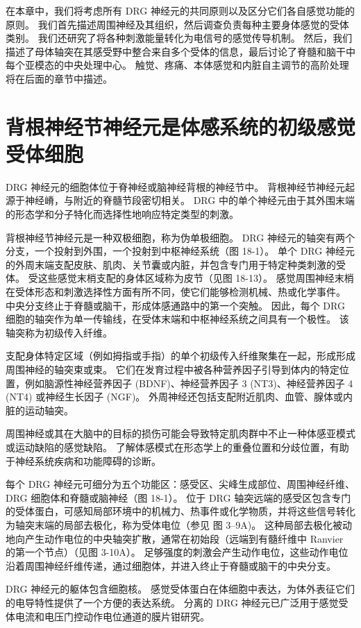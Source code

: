 在本章中，我们将考虑所有 DRG 神经元的共同原则以及区分它们各自感觉功能的原则。 我们首先描述周围神经及其组织，然后调查负责每种主要身体感觉的受体类别。 我们还研究了将各种刺激能量转化为电信号的感觉传导机制。 然后，我们描述了母体轴突在其感受野中整合来自多个受体的信息，最后讨论了脊髓和脑干中每个亚模态的中央处理中心。 触觉、疼痛、本体感觉和内脏自主调节的高阶处理将在后面的章节中描述。


\section{背根神经节神经元是体感系统的初级感觉受体细胞}

DRG 神经元的细胞体位于脊神经或脑神经背根的神经节中。 背根神经节神经元起源于神经嵴，与附近的脊髓节段密切相关。 DRG 中的单个神经元由于其外围末端的形态学和分子特化而选择性地响应特定类型的刺激。

背根神经节神经元是一种双极细胞，称为伪单极细胞。 DRG 神经元的轴突有两个分支，一个投射到外围，一个投射到中枢神经系统（图 18-1）。 单个 DRG 神经元的外周末端支配皮肤、肌肉、关节囊或内脏，并包含专门用于特定种类刺激的受体。 受这些感觉末梢支配的身体区域称为皮节（见图 18-13）。 感觉周围神经末梢在受体形态和刺激选择性方面有所不同，使它们能够检测机械、热或化学事件。 中央分支终止于脊髓或脑干，形成体感通路中的第一个突触。 因此，每个 DRG 细胞的轴突作为单一传输线，在受体末端和中枢神经系统之间具有一个极性。 该轴突称为初级传入纤维。

支配身体特定区域（例如拇指或手指）的单个初级传入纤维聚集在一起，形成形成周围神经的轴突束或束。 它们在发育过程中被各种营养因子引导到体内的特定位置，例如脑源性神经营养因子 (BDNF)、神经营养因子 3 (NT3)、神经营养因子 4 (NT4) 或神经生长因子 (NGF)。 外周神经还包括支配附近肌肉、血管、腺体或内脏的运动轴突。

周围神经或其在大脑中的目标的损伤可能会导致特定肌肉群中不止一种体感亚模式或运动缺陷的感觉缺陷。 了解体感模式在形态学上的重叠位置和分歧位置，有助于神经系统疾病和功能障碍的诊断。

每个 DRG 神经元可细分为五个功能区：感受区、尖峰生成部位、周围神经纤维、DRG 细胞体和脊髓或脑神经（图 18-1）。 位于 DRG 轴突远端的感受区包含专门的受体蛋白，可感知局部环境中的机械力、热事件或化学物质，并将这些信号转化为轴突末端的局部去极化，称为受体电位（参见 图 3–9A)。 这种局部去极化被动地向产生动作电位的中央轴突扩散，通常在初始段（远端到有髓纤维中 Ranvier 的第一个节点）（见图 3-10A）。 足够强度的刺激会产生动作电位，这些动作电位沿着周围神经纤维传递，通过细胞体，并进入终止于脊髓或脑干的中央分支。

DRG 神经元的躯体包含细胞核。 感觉受体蛋白在体细胞中表达，为体外表征它们的电导特性提供了一个方便的表达系统。 分离的 DRG 神经元已广泛用于感觉受体电流和电压门控动作电位通道的膜片钳研究。

